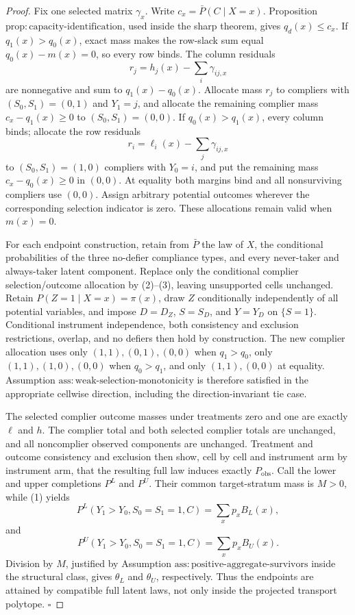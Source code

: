 \documentclass{article}
\begin{document}
\begin{proof}
Fix one selected matrix \(\gamma_x\).  Write
\(c_x=\bar P(C\mid X=x)\).  Proposition
\(\mathrm{prop{:}capacity\text{-}identification}\), used inside the sharp
theorem, gives \(q_d(x)\le c_x\).  If \(q_1(x)>q_0(x)\), exact mass makes
the row-slack sum equal \(q_0(x)-m(x)=0\), so every row binds.  The column
residuals
\[
r_j=h_j(x)-\sum_i\gamma_{ij,x}
\tag{2}
\]
are nonnegative and sum to \(q_1(x)-q_0(x)\).  Allocate mass \(r_j\) to
compliers with \((S_0,S_1)=(0,1)\) and \(Y_1=j\), and allocate the
remaining complier mass \(c_x-q_1(x)\ge0\) to \((S_0,S_1)=(0,0)\).  If
\(q_0(x)>q_1(x)\), every column binds; allocate the row residuals
\[
r_i=\ell_i(x)-\sum_j\gamma_{ij,x}
\tag{3}
\]
to \((S_0,S_1)=(1,0)\) compliers with \(Y_0=i\), and put the remaining
mass \(c_x-q_0(x)\ge0\) in \((0,0)\).  At equality both margins bind and
all nonsurviving compliers use \((0,0)\).  Assign arbitrary potential
outcomes wherever the corresponding selection indicator is zero.  These
allocations remain valid when \(m(x)=0\).

For each endpoint construction, retain from \(\bar P\) the law of \(X\),
the conditional probabilities of the three no-defier compliance types,
and every never-taker and always-taker latent component.  Replace only the
conditional complier selection/outcome allocation by (2)--(3), leaving
unsupported cells unchanged.  Retain
\(P(Z=1\mid X=x)=\pi(x)\), draw \(Z\) conditionally independently of all
potential variables, and impose \(D=D_Z\), \(S=S_D\), and \(Y=Y_D\) on
\(\{S=1\}\).  Conditional instrument independence, both consistency and
exclusion restrictions, overlap, and no defiers then hold by construction.
The new complier allocation uses only \((1,1),(0,1),(0,0)\) when
\(q_1>q_0\), only \((1,1),(1,0),(0,0)\) when \(q_0>q_1\), and only
\((1,1),(0,0)\) at equality.  Assumption
\(\mathrm{ass{:}weak\text{-}selection\text{-}monotonicity}\) is therefore
satisfied in the appropriate cellwise direction, including the
direction-invariant tie case.

The selected complier outcome masses under treatments zero and one are
exactly \(\ell\) and \(h\).  The complier total and both selected
complier totals are unchanged, and all noncomplier observed components
are unchanged.  Treatment and outcome consistency and exclusion then
show, cell by cell and instrument arm by instrument arm, that the
resulting full law induces exactly \(P_{\mathrm{obs}}\).  Call the lower
and upper completions \(P^L\) and \(P^U\).  Their common target-stratum
mass is \(M>0\), while (1) yields
\[
P^L(Y_1>Y_0,S_0=S_1=1,C)=\sum_xp_xB_L(x),
\]
and
\[
P^U(Y_1>Y_0,S_0=S_1=1,C)=\sum_xp_xB_U(x).
\]
Division by \(M\), justified by Assumption
\(\mathrm{ass{:}positive\text{-}aggregate\text{-}survivors}\) inside the
structural class, gives \(\theta_L\) and \(\theta_U\), respectively.
Thus the endpoints are attained by compatible full latent laws, not only
inside the projected transport polytope. \(\square\)
\end{proof}
\end{document}
